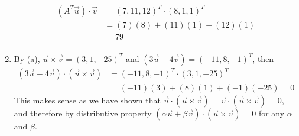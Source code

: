 \begin{Answer}
\begin{enumerate}[label=(\alph*)]
\begin{align*}
(A^T\vec{u}) \cdot \vec{v}
&= (7, 11, 12)^T \cdot (8, 1, 1)^T \\
&= (7)(8) + (11)(1) + (12)(1) \\
&= 79 \\
\end{align*}
\item By (a), $\vec{u} \times \vec{v} = (3, 1, -25)^T$ and $(3\vec{u} - 4\vec{v}) = (-11,8,-1)^T$, then
\begin{align*}
(3\vec{u} - 4\vec{v}) \cdot (\vec{u} \times \vec{v}) &= (-11,8,-1)^T \cdot (3, 1, -25)^T \\
&= (-11)(3) + (8)(1) + (-1)(-25) = 0
\end{align*}
This makes sense as we have shown that $\vec{u} \cdot (\vec{u} \times \vec{v}) = \vec{v} \cdot (\vec{u} \times \vec{v}) = 0$, and therefore by distributive property $(\alpha\vec{u} + \beta\vec{v}) \cdot (\vec{u} \times \vec{v}) = 0$ for any $\alpha$ and $\beta$.
\end{enumerate}
\end{Answer}

